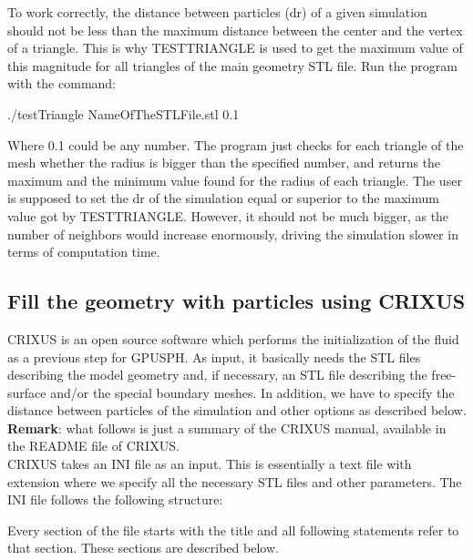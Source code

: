 To work correctly, the distance between particles (dr) of a given simulation 
should not be less than the maximum distance between the center and the 
vertex of a triangle. This is why TESTTRIANGLE is used to get the maximum 
value of this magnitude for all triangles of the main geometry STL file. 
Run the program with the command:
\begin{shellcode}
./testTriangle NameOfTheSTLFile.stl 0.1
\end{shellcode}
Where 0.1 could be any number. 
The program just checks for each triangle of the mesh whether the 
radius is bigger than the specified number, and returns the 
maximum and the minimum value found for the radius of each triangle. 
The user is supposed to set the dr of the simulation equal 
or superior to the maximum value got by TESTTRIANGLE. 
However, it should not be much bigger, as the number of neighbors 
would increase enormously, driving the simulation slower in terms of computation time.

\subsection{Fill the geometry with particles using CRIXUS}

CRIXUS is an open source software which performs the initialization 
of the fluid as a previous step for GPUSPH. 
As input, it basically needs the STL files describing the model geometry 
and, if necessary, an STL file describing the free-surface and/or the special 
boundary meshes. 
In addition, we have to specify the distance between particles 
of the simulation and other options as described below.\\

\textbf{Remark}: what follows is just a summary of the CRIXUS manual, 
available in the README file of CRIXUS.\\

CRIXUS takes an INI file as an input. 
This is essentially a text file with  extension 
where we specify all the necessary STL files and other parameters.
The INI file follows the following structure:


Every section of the file starts with the title \cmd{[XXX]} 
and all following statements refer to that section.
These sections are described below.\\

